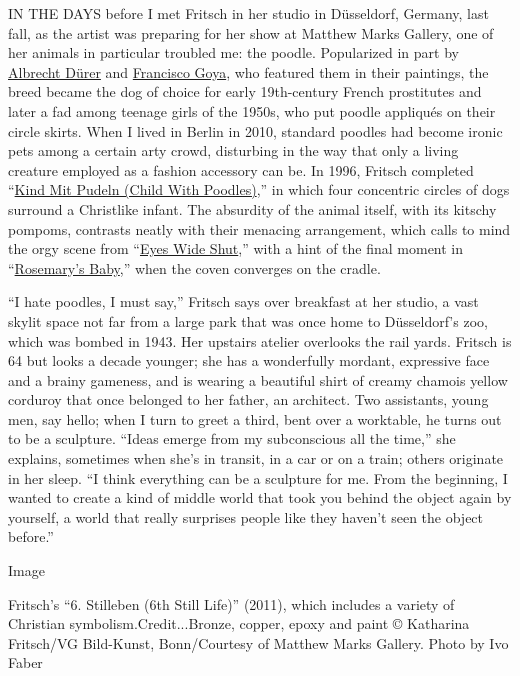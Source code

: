 IN THE DAYS before I met Fritsch in her studio in Düsseldorf, Germany,
last fall, as the artist was preparing for her show at Matthew Marks
Gallery, one of her animals in particular troubled me: the poodle.
Popularized in part by \href{https://www.albrecht-durer.org/}{Albrecht
Dürer} and
\href{https://www.nytimes3xbfgragh.onion/topic/person/francisco-de-goya}{Francisco
Goya}, who featured them in their paintings, the breed became the dog of
choice for early 19th-century French prostitutes and later a fad among
teenage girls of the 1950s, who put poodle appliqués on their circle
skirts. When I lived in Berlin in 2010, standard poodles had become
ironic pets among a certain arty crowd, disturbing in the way that only
a living creature employed as a fashion accessory can be. In 1996,
Fritsch completed
``\href{https://www.sfmoma.org/artwork/96.490.a-rrrrrrrrr/}{Kind Mit
Pudeln (Child With Poodles)},'' in which four concentric circles of dogs
surround a Christlike infant. The absurdity of the animal itself, with
its kitschy pompoms, contrasts neatly with their menacing arrangement,
which calls to mind the orgy scene from
``\href{https://www.imdb.com/title/tt0120663/}{Eyes Wide Shut},'' with a
hint of the final moment in
``\href{https://www.imdb.com/title/tt0063522/}{Rosemary's Baby},'' when
the coven converges on the cradle.

``I hate poodles, I must say,'' Fritsch says over breakfast at her
studio, a vast skylit space not far from a large park that was once home
to Düsseldorf's zoo, which was bombed in 1943. Her upstairs atelier
overlooks the rail yards. Fritsch is 64 but looks a decade younger; she
has a wonderfully mordant, expressive face and a brainy gameness, and is
wearing a beautiful shirt of creamy chamois yellow corduroy that once
belonged to her father, an architect. Two assistants, young men, say
hello; when I turn to greet a third, bent over a worktable, he turns out
to be a sculpture. ``Ideas emerge from my subconscious all the time,''
she explains, sometimes when she's in transit, in a car or on a train;
others originate in her sleep. ``I think everything can be a sculpture
for me. From the beginning, I wanted to create a kind of middle world
that took you behind the object again by yourself, a world that really
surprises people like they haven't seen the object before.''

Image

Fritsch's ``6. Stilleben (6th Still Life)'' (2011), which includes a
variety of Christian symbolism.Credit...Bronze, copper, epoxy and paint
© Katharina Fritsch/VG Bild-Kunst, Bonn/Courtesy of Matthew Marks
Gallery. Photo by Ivo Faber

